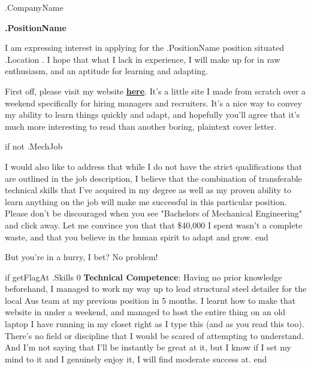 \documentclass[10pt]{letter}
\begin{document}


\thispagestyle{empty}

\address{Deon Chen \\
    i.am.deon.chen@gmail.com \\ 
    (+61) 0430 342 826
}

\begin{letter}{
    {{ .CompanyName }}
} 

\signature{Deon}

\opening{}

\textbf{
    {{ .PositionName }} 
}


I am expressing interest in applying for the {{ .PositionName }} position situated {{ .Location }}. I hope that what I lack in experience, I will make up for in raw enthusiasm, and an aptitude for learning and adapting. 

First off, please visit my website \underline{\textbf{\href{https://zabuzabuzazaa.xyz/home/dear_recruiters/}{here}}}. It's a little site I made from scratch over a weekend specifically for hiring managers and recruiters. It's a nice way to convey my ability to learn things quickly and adapt, and hopefully you'll agree that it's much more interesting to read than another boring, plaintext cover letter. 

{{ if not .MechJob }}

I would also like to address that while I do not have the strict qualifications that are outlined in the job description, I believe that the combination of transferable technical skills that I've acquired in my degree as well as my proven ability to learn anything on the job will make me successful in this particular position. Please don't be discouraged when you see "Bachelors of Mechanical Engineering" and click away. Let me convince you that that \$40,000 I spent wasn't a complete waste, and that you believe in the human spirit to adapt and grow. 
{{ end }}

But you're in a hurry, I bet? No problem!

{{ if getFlagAt .Skills 0 }} %
\textbf{Technical Competence}: Having no prior knowledge beforehand, I managed to work my way up to lead structural steel detailer for the local Aus team at my previous position in 5 months. I learnt how to make that website in under a weekend, and managed to host the entire thing on an old laptop I have running in my closet right as I type this (and as you read this too). There's no field or discipline that I would be scared of attempting to understand. And I'm not saying that I'll be instantly be great at it, but I know if I set my mind to it and I genuinely enjoy it, I will find moderate success at. 
{{ end }}


\end{letter}
\end{document}
